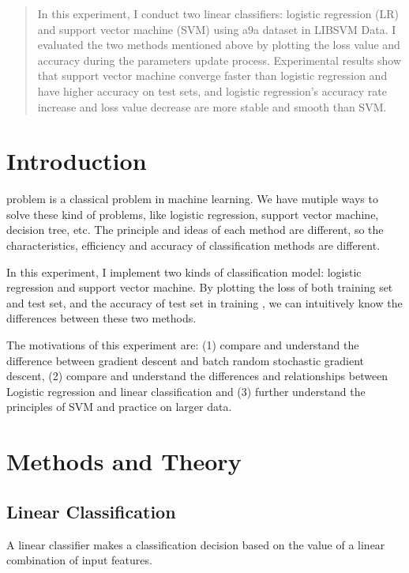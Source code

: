 \documentclass[journal, a4paper]{IEEEtran}
\begin{document}
\begin{abstract}
In this experiment, I conduct two linear classifiers: logistic regression (LR) and support vector machine (SVM) using a9a dataset in LIBSVM Data. I evaluated the two methods mentioned above by plotting the loss value and accuracy during the parameters update process. Experimental results show that support vector machine converge faster than logistic regression and have higher accuracy on test sets, and  logistic regression's accuracy rate increase and loss value decrease are more stable and smooth than SVM.

\end{abstract}

\section{Introduction}
 problem is a classical problem in machine learning. We have mutiple ways to solve these kind of problems, like logistic regression, support vector machine, decision tree, etc. The principle and ideas of each method are different, so the characteristics, efficiency and accuracy of classification methods are different. 

In this experiment, I implement two kinds of classification model: logistic regression and support vector machine. By plotting the loss of both training set and test set, and the accuracy of test set in training , we can intuitively know the differences between these two methods.

The motivations of this experiment are: (1) compare and understand the difference between gradient descent and batch random stochastic gradient descent, (2) compare and understand the differences and relationships between Logistic regression and linear classification and (3) further understand the principles of SVM and practice on larger data.

\section{Methods and Theory}

\subsection{Linear Classification}
 A linear classifier makes a classification decision based on the value of a linear combination of input features. 
\end{document}
